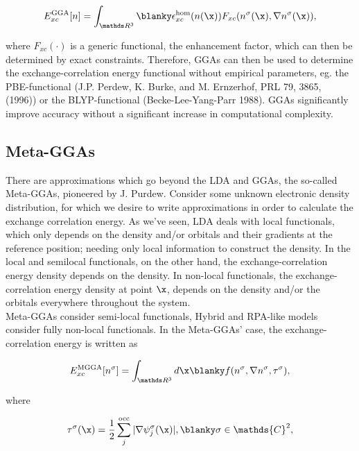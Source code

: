 \documentclass{homework}
\begin{document}
\begin{equation}
    E_{xc}^{\textnormal{GGA}}[n] = \int_{\R^3} \blanky \epsilon_{xc}^{\textnormal{hom}}(n(\x)) F_{xc} (n^{\sigma}(\x), \nabla n^{\sigma}(\x)),
\end{equation}

where $F_{xc}(\cdot)$ is a generic functional, the enhancement factor, which can then be determined by exact constraints. Therefore, GGAs can then be used to determine the exchange-correlation energy functional without empirical parameters, eg. the PBE-functional (J.P. Perdew, K. Burke, and M. Ernzerhof, PRL 79, 3865, (1996)) or the BLYP-functional (Becke-Lee-Yang-Parr 1988). GGAs significantly improve accuracy without a significant increase in computational complexity. \\

\subsection{Meta-GGAs}

There are approximations which go beyond the LDA and GGAs, the so-called Meta-GGAs, pioneered by J. Purdew. Consider some unknown electronic density distribution, for which we desire to write approximations in order to calculate the exchange correlation energy. As we've seen, LDA deals with local functionals, which only depends on the density and/or orbitals and their gradients at the reference position; needing only local information to construct the density. In the local and semilocal functionals, on the other hand, the exchange-correlation energy density depends on the density. In non-local functionals, the exchange-correlation energy density at point $\x$, depends on the density and/or the orbitals everywhere throughout the system. \\

Meta-GGAs consider semi-local functionals, Hybrid and RPA-like models consider fully non-local functionals. In the Meta-GGAs' case, the exchange-correlation energy is written as 

\begin{equation}
    E_{xc}^{\textnormal{MGGA}}[n^\sigma] = \int_{\R^3} d\x \blanky f(n^\sigma, \nabla n^\sigma, \tau^\sigma),
\end{equation}

where

$$\tau^\sigma(\x) = \frac{1}{2} \sum_{j}^{\textnormal{occ}} |\nabla\psi_j^\sigma (\x)|, \blanky \sigma \in \mathds{C}^2,$$
\end{document}
